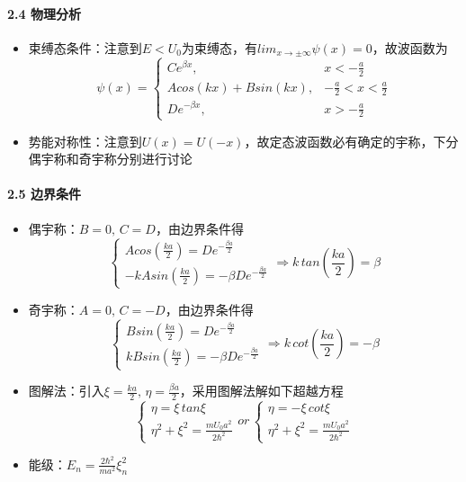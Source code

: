 \documentclass[UTF8,twocolumn]{ctexart}
\providecommand{\tightlist}{%
  \setlength{\itemsep}{0pt}\setlength{\parskip}{0pt}}
\let\oldparagraph\paragraph
\renewcommand{\paragraph}[1]{\oldparagraph{#1}\mbox{}}
\begin{document}
\hypertarget{ux7269ux7406ux5206ux6790}{%
\paragraph{{ }2.4 物理分析}\label{ux7269ux7406ux5206ux6790}}

\begin{itemize}
\tightlist
\item
  束缚态条件：注意到\(E<U_0\)为束缚态，有\(lim_{x\to\pm\infty}\psi(x)=0\)，故波函数为
  \[\psi(x)=\begin{cases} 
        Ce^{\beta x}, & x<-\frac{a}{2}\\
        Acos(kx)+Bsin(kx), & -\frac{a}{2}<x<\frac{a}{2}\\
        De^{-\beta x}, & x>-\frac{a}{2}
  \end{cases}\]
\item
  势能对称性：注意到\(U(x)=U(-x)\)，故定态波函数必有确定的宇称，下分偶宇称和奇宇称分别进行讨论
\end{itemize}

\hypertarget{ux8fb9ux754cux6761ux4ef6-1}{%
\paragraph{{ }2.5 边界条件}\label{ux8fb9ux754cux6761ux4ef6-1}}

\begin{itemize}
\tightlist
\item
  偶宇称：\(B=0,\,C=D\)，由边界条件得 \[\begin{cases} 
        Acos(\frac{ka}{2})=De^{-\frac{\beta a}{2}}\\
        -kAsin(\frac{ka}{2})=-\beta De^{-\frac{\beta a}{2}}
  \end{cases}\Rightarrow k\,tan(\frac{ka}{2})=\beta\]
\item
  奇宇称：\(A=0,\,C=-D\)，由边界条件得 \[\begin{cases} 
        Bsin(\frac{ka}{2})=De^{-\frac{\beta a}{2}}\\
        kBsin(\frac{ka}{2})=-\beta De^{-\frac{\beta a}{2}}
  \end{cases}\Rightarrow k\,cot(\frac{ka}{2})=-\beta\]
\item
  图解法：引入\(\xi=\frac{ka}{2},\,\eta=\frac{\beta a}{2}\)，采用图解法解如下超越方程
  \[\begin{cases} 
        \eta=\xi\,tan\xi\\
        \eta^2+\xi^2=\frac{mU_0a^2}{2\hbar^2}
  \end{cases}or\,
  \begin{cases} 
        \eta=-\xi\,cot\xi\\
        \eta^2+\xi^2=\frac{mU_0a^2}{2\hbar^2}
  \end{cases}\]
\item
  能级：\(E_n=\frac{2\hbar^2}{ma^2}\xi_n^2\)
\end{itemize}
\end{document}
